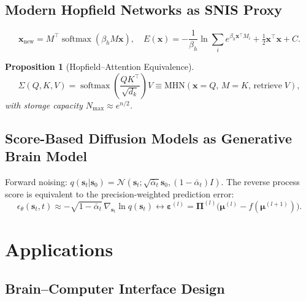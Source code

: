 \documentclass[12pt,a4paper]{article}
\theoremstyle{plain}
\newtheorem{proposition}[theorem]{Proposition}
\theoremstyle{definition}
\theoremstyle{remark}
\newcommand{\softmax}{\operatorname{softmax}}
\newcommand{\SigmaOp}{\Sigma}
\begin{document}
\subsection{Modern Hopfield Networks as SNIS Proxy}

\begin{tcolorbox}[mathbox, title={Modern Hopfield Update Rule}]
\begin{equation}
\mathbf{x}_\mathrm{new} = M^\top\softmax(\beta_h M\mathbf{x}),\quad
E(\mathbf{x}) = -\frac{1}{\beta_h}\ln\!\sum_i e^{\beta_h\mathbf{x}^\top M_i} + \tfrac{1}{2}\mathbf{x}^\top\mathbf{x} + C.
\label{eq:Hopfield}
\end{equation}
\end{tcolorbox}

\begin{proposition}[Hopfield--Attention Equivalence]
\begin{equation}
\SigmaOp(Q,K,V) = \softmax\!\left(\frac{QK^\top}{\sqrt{d_k}}\right)V
\equiv \mathrm{MHN}(\mathbf{x}=Q,\,M=K,\,\mathrm{retrieve}\;V),
\end{equation}
with storage capacity $N_\mathrm{max}\approx e^{n/2}$.
\end{proposition}

\subsection{Score-Based Diffusion Models as Generative Brain Model}

Forward noising: $q(\mathbf{s}_t|\mathbf{s}_0) = \mathcal{N}(\mathbf{s}_t;\sqrt{\bar\alpha_t}\mathbf{s}_0,(1-\bar\alpha_t)I)$.
The reverse process score is equivalent to the precision-weighted prediction error:
\begin{equation}
\epsilon_\theta(\mathbf{s}_t,t)\approx -\sqrt{1-\bar\alpha_t}\,\nabla_{\mathbf{s}_t}\ln q(\mathbf{s}_t)
\longleftrightarrow \bm{\varepsilon}^{(l)} = \bm{\Pi}^{(l)}\!\bigl(\bm{\mu}^{(l)}-f(\bm{\mu}^{(l+1)})\bigr).
\end{equation}

\section{Applications}
\label{sec:apps}

\subsection{Brain--Computer Interface Design}
\end{document}
